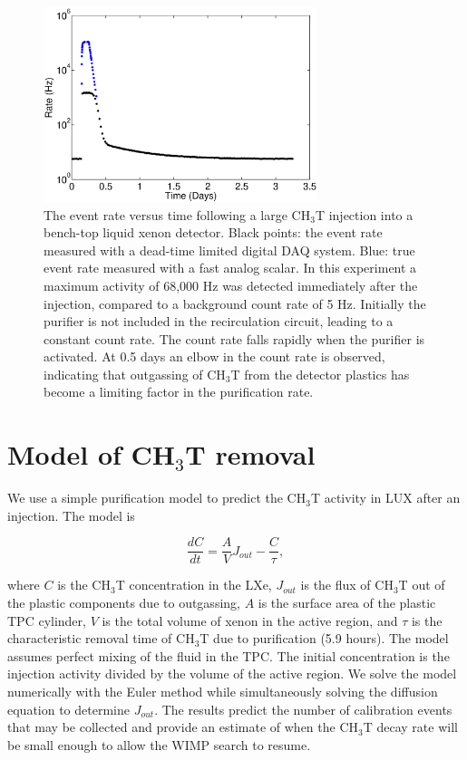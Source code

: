\begin{figure}[h!]\centering
\includegraphics[width=80mm]{fig/TimeHisto_Analog2.eps}
\caption{The event rate versus time following a large CH$_3$T injection into a bench-top liquid xenon detector. Black points: the event rate measured with a dead-time limited digital DAQ system. Blue: true event rate measured with a fast analog scalar. In this experiment a maximum activity of 68,000 Hz was detected immediately after the injection, compared to a background count rate of 5 Hz. Initially the purifier is not included in the recirculation circuit, leading to a constant count rate. The count rate falls rapidly when the purifier is activated. At 0.5 days an elbow in the count rate is observed, indicating that outgassing of CH$_3$T from the detector plastics has become a limiting factor in the purification rate. }
\label{fig:Density}
\end{figure}


\section{Model of CH$_3$T removal}
\label{sec:appendix2}

We use a simple purification model to predict the CH$_3$T activity in LUX after an injection. The model is 

\begin{equation}
\frac{dC}{dt} = \frac{A}{V}J_{out} -\frac{C}{\tau},
\end{equation}

\noindent where  $C$ is the CH$_3$T concentration in the LXe,  $J_{out}$ is the flux of CH$_3$T out of the plastic components due to outgassing,  $A$ is the surface area of the plastic TPC cylinder, $V$ is the total volume of xenon in the active region, and $\tau$ is the characteristic removal time of CH$_3$T due to purification (5.9 hours). The model assumes perfect mixing of the fluid in the TPC. The initial concentration is the injection activity divided by the volume of the active region. We solve the model numerically with the Euler method while simultaneously solving the diffusion equation to determine $J_{out}$. The results predict the number of calibration events that may be collected and provide an estimate of when the CH$_3$T  decay rate will be small enough to allow the WIMP search to resume.

